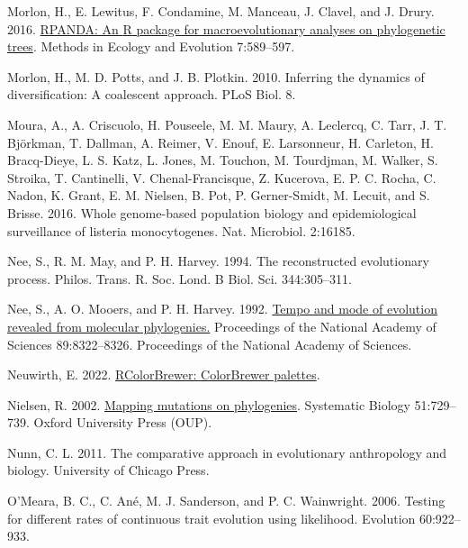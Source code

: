 \documentclass[fleqn,10pt,lineno]{wlpeerj} %
\newlength{\cslhangindent}
\newlength{\cslentryspacingunit} %
\newenvironment{CSLReferences}[2] %
 {%
  \setlength{\parindent}{0pt}
  \ifodd #1
  \let\oldpar\par
  \def\par{\hangindent=\cslhangindent\oldpar}
  \fi
  \setlength{\parskip}{#2\cslentryspacingunit}
 }%
 {}
\begin{document}
\begin{CSLReferences}{1}{0}
\leavevmode{}%
Morlon, H., E. Lewitus, F. Condamine, M. Manceau, J. Clavel, and J. Drury. 2016. \href{https://CRAN.R-project.org/package=RPANDA}{RPANDA: An {R} package for macroevolutionary analyses on phylogenetic trees}. Methods in Ecology and Evolution 7:589--597.

\leavevmode{}%
Morlon, H., M. D. Potts, and J. B. Plotkin. 2010. Inferring the dynamics of diversification: A coalescent approach. PLoS Biol. 8.

\leavevmode{}%
Moura, A., A. Criscuolo, H. Pouseele, M. M. Maury, A. Leclercq, C. Tarr, J. T. Björkman, T. Dallman, A. Reimer, V. Enouf, E. Larsonneur, H. Carleton, H. Bracq-Dieye, L. S. Katz, L. Jones, M. Touchon, M. Tourdjman, M. Walker, S. Stroika, T. Cantinelli, V. Chenal-Francisque, Z. Kucerova, E. P. C. Rocha, C. Nadon, K. Grant, E. M. Nielsen, B. Pot, P. Gerner-Smidt, M. Lecuit, and S. Brisse. 2016. Whole genome-based population biology and epidemiological surveillance of listeria monocytogenes. Nat. Microbiol. 2:16185.

\leavevmode{}%
Nee, S., R. M. May, and P. H. Harvey. 1994. The reconstructed evolutionary process. Philos. Trans. R. Soc. Lond. B Biol. Sci. 344:305--311.

\leavevmode{}%
Nee, S., A. O. Mooers, and P. H. Harvey. 1992. \href{https://doi.org/10.1073/pnas.89.17.8322}{Tempo and mode of evolution revealed from molecular phylogenies.} Proceedings of the National Academy of Sciences 89:8322--8326. Proceedings of the National Academy of Sciences.

\leavevmode{}%
Neuwirth, E. 2022. \href{https://CRAN.R-project.org/package=RColorBrewer}{RColorBrewer: ColorBrewer palettes}.

\leavevmode{}%
Nielsen, R. 2002. \href{https://doi.org/10.1080/10635150290102393}{Mapping mutations on phylogenies}. Systematic Biology 51:729--739. Oxford University Press ({OUP}).

\leavevmode{}%
Nunn, C. L. 2011. The comparative approach in evolutionary anthropology and biology. University of Chicago Press.

\leavevmode{}%
O'Meara, B. C., C. Ané, M. J. Sanderson, and P. C. Wainwright. 2006. Testing for different rates of continuous trait evolution using likelihood. Evolution 60:922--933.


\end{CSLReferences}
\end{document}
